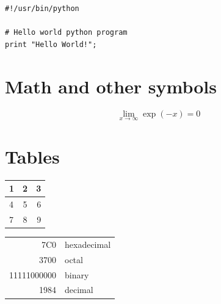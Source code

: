 \documentclass[12pt,a4paper,twoside]{article}
\begin{document}
\begin{lstlisting}[frame=single]
#!/usr/bin/python

# Hello world python program
print "Hello World!";
\end{lstlisting}


\section{Math and other symbols}

$$ \lim_{x \to \infty} \exp(-x) = 0 $$

\section{Tables}

\begin{center}
  \begin{tabular}{ l | c || r }
    \hline
    1 & 2 & 3 \\ \hline
    4 & 5 & 6 \\ \hline
    7 & 8 & 9 \\
    \hline
  \end{tabular}
\end{center}

\begin{tabular}{|r|l|}
  \hline
  7C0 & hexadecimal \\
  3700 & octal \\ \cline{2-2}
  11111000000 & binary \\
  \hline \hline
  1984 & decimal \\
  \hline
\end{tabular}
\end{document}
